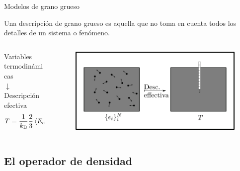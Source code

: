 \begin{frame}{Modelos de grano grueso}
    \begin{center}
        Una descripción de grano grueso es aquella que no toma en cuenta todos los detalles de un sistema o fenómeno.
    \end{center}
    \pause
    \begin{columns}
        \begin{column}{0.5\textwidth}
            \begin{center}
                Variables termodinámicas\\
                $\downarrow$\\
                Descripción efectiva\\
                \pause
                \begin{equation}
                    T=\frac{1}{k_\text{B}}\frac{2}{3}\expval{E_{\text{cin}}}.\nonumber
                \end{equation}
            \end{center}
        \end{column}
        \begin{column}{0.5\textwidth}
            \begin{figure}
                \includegraphics[width=1\textwidth]{figures/CGT.png}
            \end{figure}
        \end{column}
    \end{columns}
\end{frame}

\subsection{El operador de densidad}

